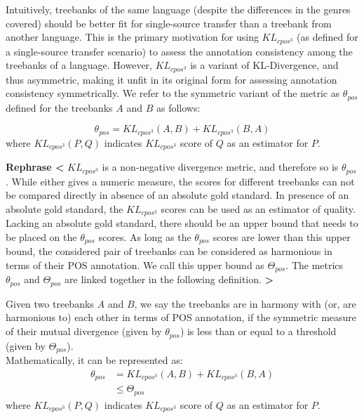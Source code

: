 Intuitively, treebanks of the same language (despite the differences in the genres covered) should be better fit for single-source transfer than a treebank from another language. This is the primary motivation for using \(KL_{cpos^3}\) (as defined for a single-source transfer scenario) to assess the annotation consistency among the treebanks of a language. However, \(KL_{cpos^3}\) is a variant of KL-Divergence, and thus asymmetric, making it unfit in its original form for assessing annotation consistency symmetrically. We refer to the symmetric variant of the metric as \(\theta_{pos}\) defined for the treebanks \(A\) and \(B\) as follows:

\begin{equation}
    \theta_{pos} = KL_{cpos^3}(A,B) + KL_{cpos^3}(B,A)
\end{equation}
where \(KL_{cpos^3}(P,Q)\) indicates \(KL_{cpos^3}\) score of \(Q\) as an estimator for \(P\).

\textbf{Rephrase <}
\(KL_{cpos^3}\) is a non-negative divergence metric, and therefore so is \(\theta_{pos}\). While either gives a numeric measure, the scores for different treebanks can not be compared directly in absence of an absolute gold standard. In presence of an absolute gold standard, the \(KL_{cpos^3}\) scores can be used as an estimator of quality. Lacking an absolute gold standard, there should be an upper bound that needs to be placed on the \(\theta_{pos}\) scores. As long as the \(\theta_{pos}\) scores are lower than this upper bound, the considered pair of treebanks can be considered as harmonious in terms of their POS annotation. We call this upper bound as \(\Theta_{pos}\). The metrics \(\theta_{pos}\) and \(\Theta_{pos}\) are linked together in the following definition.
\textbf{>}

\begin{definition}
\label{def:harmony}
Given two treebanks \(A\) and \(B\), we say the treebanks are in harmony with (or, are harmonious to) each other in terms of POS annotation, if the symmetric measure of their mutual divergence (given by \(\theta_{pos}\)) is less than or equal to a threshold (given by \(\Theta_{pos}\)). \\
    Mathematically, it can be represented as:
    \begin{align}
    \label{eq:pos_harmony}
        \theta_{pos} & = \nonumber KL_{cpos^3}(A,B) + KL_{cpos^3}(B,A) \\ &\leq \Theta_{pos}
    \end{align}
    where \(KL_{cpos^3}(P,Q)\) indicates \(KL_{cpos^3}\) score of \(Q\) as an estimator for \(P\).
\end{definition}

